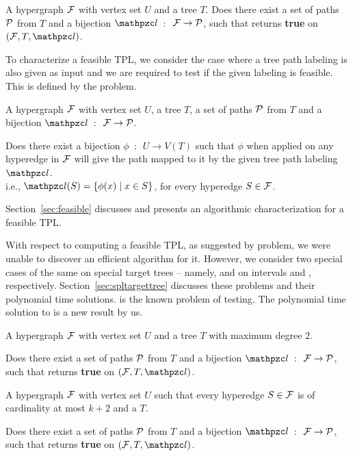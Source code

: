 \begin{problemdef}{\CFTPL}{A hypergraph ${\cal F}$ with vertex set $U$ and
    a tree $T$.}
  Does there exist a set of paths ${\cal P}$ from $T$ and a bijection
  $\cl$~$:$~${\cal F} \rightarrow {\cal P}$, such that {\FTPL} returns {\bf
    true} on $(\cF, T, \cl)$.
\end{problemdef}

To characterize a feasible TPL, we consider the case where a tree path
labeling is also given as input and we are required to test if the
given labeling is feasible. This is defined by the \FTPL problem.

\begin{problemdef}{\FTPL}{A hypergraph ${\cal F}$ with vertex set $U$, a
    tree $T$, a set of paths ${\cal P}$ from $T$ and a bijection
    $\cl$~$:$~${\cal F} \rightarrow {\cal P}$.}

  Does there exist a bijection $\phi$~$:$~$U \rightarrow V(T)$ such
  that $\phi$ when applied on any hyperedge in ${\cal F}$ will give
  the path mapped to it by the given tree path labeling $\cl$.\\
  { i.e., $\cl(S) = \{\phi(x) \mid x \in S\}$, for every hyperedge $S
    \in {\cal F}$.}
\end{problemdef}

Section~\ref{sec:feasible} discusses \FTPL and presents an algorithmic
characterization for a feasible TPL.

With respect to computing a feasible TPL, as suggested by \CFTPL
problem, we were unable to discover an efficient algorithm for
it. However, we consider two special cases of the same on special
target trees -- namely, \CFTPLINT and \CFTPLKTREE on intervals and
\kstars, respectively.  Section~\ref{sec:spltargettree} discusses
these problems and their polynomial time solutions.  \CFTPLINT is the
known problem of \COP testing. The polynomial time solution to
\CFTPLKTREE is a new result by us.

\begin{problemdef}{\CFTPLINT}{ A hypergraph ${\cal F}$ with vertex set $U$
    and a tree $T$ with maximum degree 2.}

  Does there exist a set of paths ${\cal P}$ from $T$ and a bijection
  $\cl$~$:$~${\cal F} \rightarrow {\cal P}$, such that {\FTPL} returns {\bf
    true} on $(\cF, T, \cl)$.  
\end{problemdef}

\begin{problemdef}{\CFTPLKTREE}{A hypergraph ${\cal F}$ with vertex set $U$
    such that every hyperedge $S \in {\cal F}$ is of cardinality at most
    $k+2$ and a {\kstar} $T$.}

  Does there exist a set of paths ${\cal P}$ from $T$ and a bijection
  $\cl$~$:$~${\cal F} \rightarrow {\cal P}$, such that {\FTPL} returns {\bf
    true} on $(\cF, T, \cl)$.
\end{problemdef}

